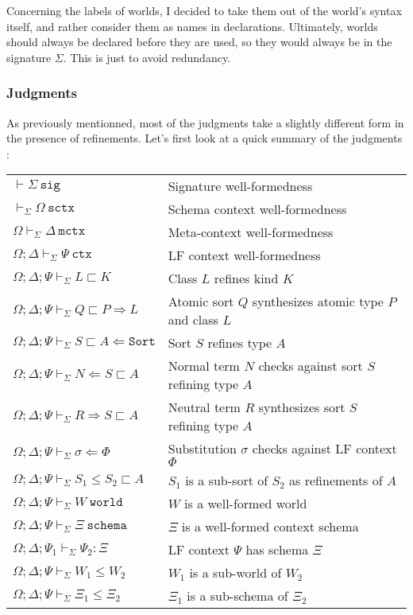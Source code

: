 \documentclass[letterpaper, 11pt]{article}
\newcommand{\Rar}{\Rightarrow}
\newcommand{\Lar}{\Leftarrow}
\newcommand{\Sort}{\texttt{Sort}}
\newcommand{\world}{\texttt{world}}
\newcommand{\schema}{\texttt{schema}}
\newcommand{\ctx}{\texttt{ctx}}
\newcommand{\mctx}{\texttt{mctx}}
\newcommand{\sctx}{\texttt{sctx}}
\newcommand{\sig}{\texttt{sig}}
\begin{document}
    Concerning the labels of worlds, I decided to take them out of the world's syntax itself, and rather consider them as names in declarations.  
    Ultimately, worlds should always be declared before they are used, so they would always be in the signature $\Sigma$.  This is just to avoid redundancy.

    \subsubsection{Judgments}
    As previously mentionned, most of the judgments take a slightly different form in the presence of refinements.  Let's first look at a 
    quick summary of the judgments :

    \begin{tabular}{ll}
        $ \vdash \Sigma \ \sig $                                       & Signature well-formedness \\
        $ \vdash_\Sigma \Omega \ \sctx$                                 & Schema context well-formedness \\
        $ \Omega \vdash_\Sigma \Delta \ \mctx $                         & Meta-context well-formedness \\
        $ \Omega; \Delta \vdash_\Sigma \Psi \ \ctx $                    & LF context well-formedness \\
        $ \Omega; \Delta; \Psi \vdash_\Sigma L \sqsubset K $            & Class $L$ refines kind $K$ \\
        $ \Omega; \Delta; \Psi \vdash_\Sigma Q \sqsubset P \Rar L $     & Atomic sort $Q$ synthesizes atomic type $P$ and class $L$ \\
        $ \Omega; \Delta; \Psi \vdash_\Sigma S \sqsubset A \Lar \Sort $ & Sort $S$ refines type $A$ \\
        $ \Omega; \Delta; \Psi \vdash_\Sigma N \Lar S \sqsubset A $     & Normal term $N$ checks against sort $S$ refining type $A$ \\
        $ \Omega; \Delta; \Psi \vdash_\Sigma R \Rar S \sqsubset A $     & Neutral term $R$ synthesizes sort $S$ refining type $A$ \\
        $ \Omega; \Delta; \Psi \vdash_\Sigma \sigma \Lar \Phi $         & Substitution $\sigma$ checks against LF context $\Phi$ \\
        $ \Omega; \Delta; \Psi \vdash_\Sigma S_1 \leq S_2 \sqsubset A $ & $S_1$ is a sub-sort of $S_2$ as refinements of $A$ \\
        $ \Omega; \Delta; \Psi \vdash_\Sigma W \ \world $               & $W$ is a well-formed world \\
        $ \Omega; \Delta; \Psi \vdash_\Sigma \Xi \ \schema $            & $\Xi$ is a well-formed context schema \\
        $ \Omega; \Delta; \Psi_1 \vdash_\Sigma \Psi_2 : \Xi $           & LF context $\Psi$ has schema $\Xi$ \\
        $ \Omega; \Delta; \Psi \vdash_\Sigma W_1 \leq W_2 $             & $W_1$ is a sub-world of $W_2$\\
        $ \Omega; \Delta; \Psi \vdash_\Sigma \Xi_1 \leq \Xi_2 $         & $\Xi_1$ is a sub-schema of $\Xi_2$
    \end{tabular}
\end{document}
